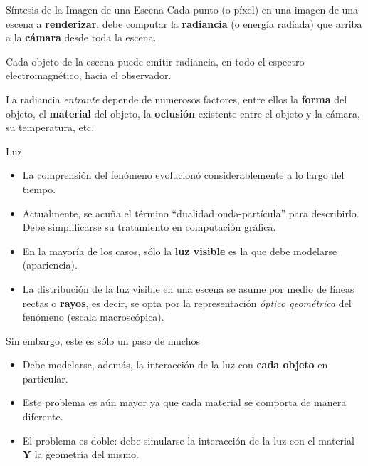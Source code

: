 \documentclass[spanish]{beamer}
\begin{document}
\begin{frame}{Síntesis de la Imagen de una Escena}
Cada punto (o píxel) en una imagen de una escena a \textbf{renderizar}, debe computar la \textbf{radiancia} (o energía radiada) que arriba a la \textbf{cámara} desde toda la escena.

\vspace{0.4cm}
Cada objeto de la escena puede emitir radiancia, en todo el espectro electromagnético, hacia el observador.

\vspace{0.4cm}
La radiancia \textit{entrante} depende de numerosos factores, entre ellos la \textbf{forma} del objeto, el \textbf{material} del objeto, la \textbf{oclusión} existente entre el objeto y la cámara, su temperatura, etc.
\end{frame}



\begin{frame}[Luz]
\begin{block}{Luz}
\begin{itemize}
\item La comprensión del fenómeno evolucionó considerablemente a lo largo del tiempo.
\item Actualmente, se acuña el término ``dualidad onda-partícula'' para describirlo. Debe simplificarse su tratamiento en computación gráfica.
\item En la mayoría de los casos, sólo la \textbf{luz visible} es la que debe modelarse (apariencia).
\item La distribución de la luz visible en una escena se asume por medio de líneas rectas o \textbf{rayos}, es decir, se opta por la representación {\em óptico geométrica} del fenómeno (escala macroscópica).
\end{itemize}
\end{block}
\end{frame}

\begin{frame}{}

\centering

\begin{block}{Sin embargo, este es sólo un paso de muchos}
\begin{itemize}
\item Debe modelarse, además, la interacción de la luz con \textbf{cada objeto} en particular.
\item Este problema es aún mayor ya que cada material se comporta de manera diferente.
\item El problema es doble: debe simularse la interacción de la luz con el material \textbf{Y} la geometría del mismo.
\end{itemize}
\end{block}

\end{frame}
\end{document}
